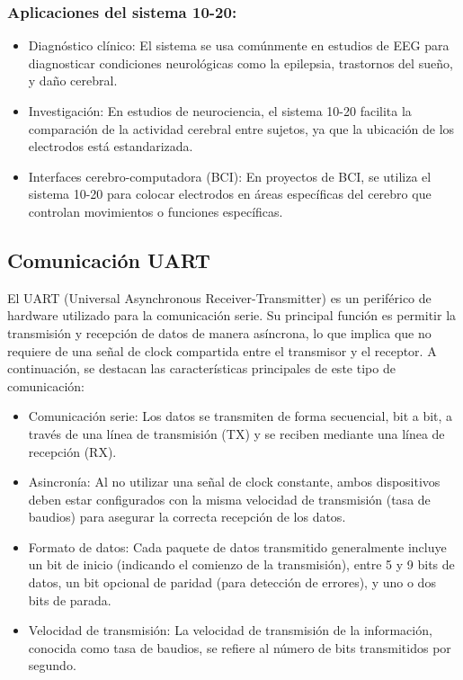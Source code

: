 \documentclass{article}
\begin{document}
\subsubsection{Aplicaciones del sistema 10-20:}
\begin{itemize}
    \item Diagnóstico clínico: El sistema se usa comúnmente en estudios de EEG para diagnosticar condiciones neurológicas como la epilepsia, trastornos del sueño, y daño cerebral.
    \item Investigación: En estudios de neurociencia, el sistema 10-20 facilita la comparación de la actividad cerebral entre sujetos, ya que la ubicación de los electrodos está estandarizada.
    \item Interfaces cerebro-computadora (BCI): En proyectos de BCI, se utiliza el sistema 10-20 para colocar electrodos en áreas específicas del cerebro que controlan movimientos o funciones específicas.
\end{itemize}


\subsection{Comunicación UART}

El UART (Universal Asynchronous Receiver-Transmitter) es un periférico de hardware utilizado para la comunicación serie. Su principal función es permitir la transmisión y recepción de datos de manera asíncrona, lo que implica que no requiere de una señal de clock compartida entre el transmisor y el receptor. A continuación, se destacan las características principales de este tipo de comunicación:

\begin{itemize}
    \item Comunicación serie: Los datos se transmiten de forma secuencial, bit a bit, a través de una línea de transmisión (TX) y se reciben mediante una línea de recepción (RX).
    \item Asincronía: Al no utilizar una señal de clock constante, ambos dispositivos deben estar configurados con la misma velocidad de transmisión (tasa de baudios) para asegurar la correcta recepción de los datos.
    \item Formato de datos: Cada paquete de datos transmitido generalmente incluye un bit de inicio (indicando el comienzo de la transmisión), entre 5 y 9 bits de datos, un bit opcional de paridad (para detección de errores), y uno o dos bits de parada.
    \item Velocidad de transmisión: La velocidad de transmisión de la información, conocida como tasa de baudios, se refiere al número de bits transmitidos por segundo.
\end{itemize}
\end{document}
